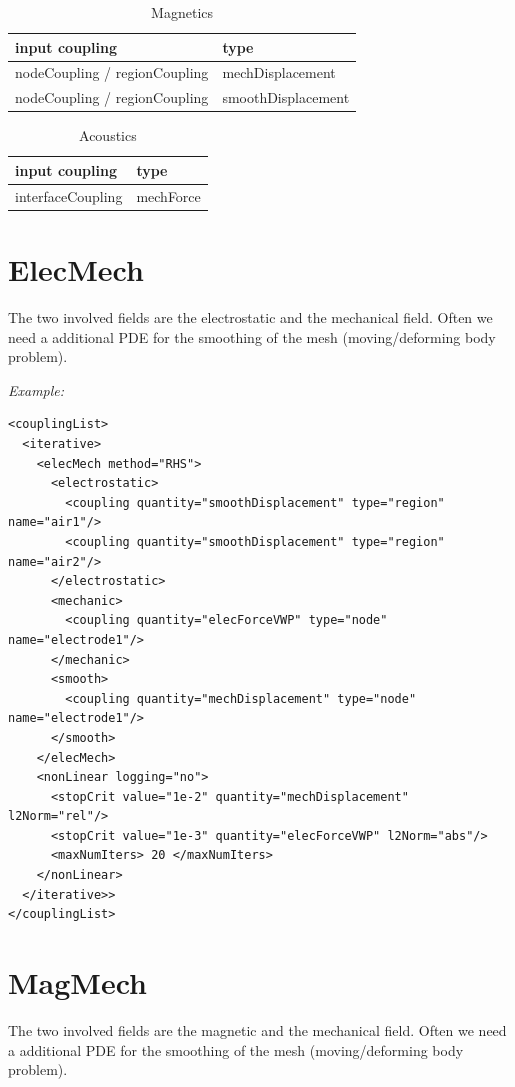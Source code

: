 \begin{table}[htb]
\begin{center}
\caption{Magnetics}
\bigskip
\begin{tabular}{l|l}
input coupling    & type \\\hline \hline
nodeCoupling / regionCoupling & mechDisplacement \\
nodeCoupling / regionCoupling & smoothDisplacement 
\end{tabular}
\end{center}
\end{table}

\begin{table}[htb]
\begin{center}
\caption{Acoustics}
\bigskip
\begin{tabular}{l|l}
input coupling    & type \\\hline \hline
interfaceCoupling      & mechForce \\
\end{tabular}
\end{center}
\end{table}

\section{ElecMech}
The two involved fields are the electrostatic and the mechanical field.
Often we need a additional PDE for the smoothing of the mesh (moving/deforming 
body problem).

\bigskip
\noindent
{\it Example:}

\begin{verbatim}
<couplingList>
  <iterative>
    <elecMech method="RHS">
      <electrostatic>
        <coupling quantity="smoothDisplacement" type="region" name="air1"/>
        <coupling quantity="smoothDisplacement" type="region" name="air2"/>
      </electrostatic>
      <mechanic>
        <coupling quantity="elecForceVWP" type="node" name="electrode1"/>
      </mechanic>
      <smooth>
        <coupling quantity="mechDisplacement" type="node" name="electrode1"/>
      </smooth>
    </elecMech>
    <nonLinear logging="no">
      <stopCrit value="1e-2" quantity="mechDisplacement" l2Norm="rel"/>
      <stopCrit value="1e-3" quantity="elecForceVWP" l2Norm="abs"/>
      <maxNumIters> 20 </maxNumIters>
    </nonLinear>
  </iterative>>
</couplingList>
\end{verbatim}

\section{MagMech}
The two involved fields are the magnetic and the mechanical field.
Often we need a additional PDE for the smoothing of the mesh (moving/deforming 
body problem).

